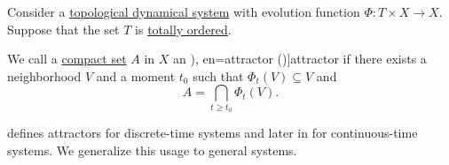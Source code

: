\begin{definition}\label{def:dynamical_system_attractor}\mimprovised
  Consider a \hyperref[def:topological_dynamical_system]{topological dynamical system} with evolution function \( \Phi: T \times X \to X \). Suppose that the set \( T \) is \hyperref[def:totally_ordered_set]{totally ordered}.

  We call a \hyperref[def:compact_space]{compact set} \( A \) in \( X \) an \term[ru=аттрактор (\cite[94]{Юмагулов2015ДинамическиеСистемы}), en=attractor (\cite[def. 3.1.1]{HasselblattKatok1995DynamicalSystems})]{attractor} if there exists a neighborhood \( V \) and a moment \( t_0 \) such that \( \Phi_t(V) \subseteq V \) and
  \begin{equation}\label{eq:def:dynamical_system_attractor}
    A = \bigcap_{t \geq t_0} \Phi_t(V).
  \end{equation}
\end{definition}
\begin{comments}
  \item {} defines attractors for discrete-time systems and later in \cite[169]{Юмагулов2015ДинамическиеСистемы} for continuous-time systems. We generalize this usage to general systems.
\end{comments}

